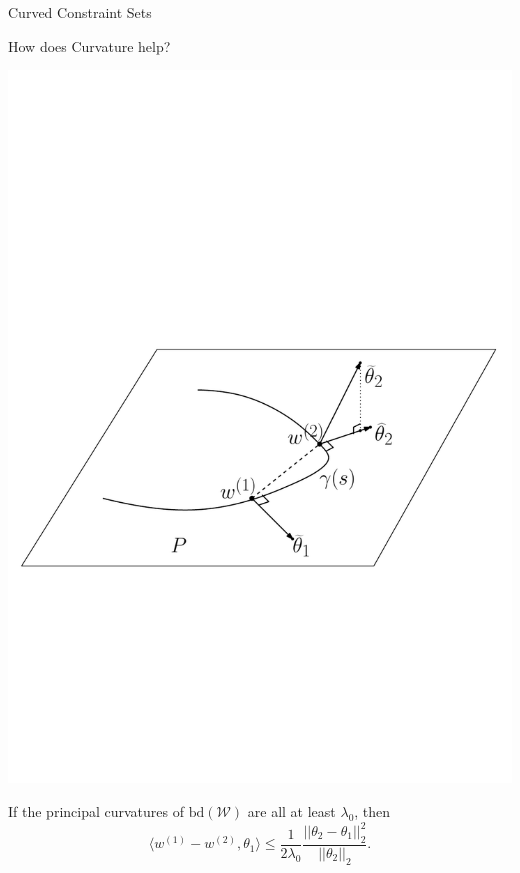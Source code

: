 \documentclass[final]{beamer} %
\newcommand{\cW}{\mathcal{W}}
\newcommand{\bd}{\mathrm{bd}}
\begin{document}
\begin{frame}[c]
\begin{columns}[t,totalwidth=\textwidth]
\begin{column}{.24\textwidth}
\begin{block}{Curved Constraint Sets}
\begin{minipage}{0.95\textwidth}
\begin{block}{How does Curvature help?}
\begin{minipage}[b]{0.4\textwidth}
					{\includegraphics[width=\textwidth, trim={4.8cm 1cm 3cm 0},clip]{figures/GaussmapPro}}
					\end{minipage}
				\end{block}
			\end{minipage}
			\begin{tcolorbox}[title = \vspace{0.4cm}{Curvature and Stability} \vspace{0.4cm}, title filled, colbacktitle = uofagreen!10, width = 0.9\textwidth, colback = uofagreen!10, colframe = red, coltitle = black, arc = 16pt]
				If the principal curvatures of $\bd(\cW)$ are all at least $\lambda_0$, then 
				\[
				\langle w^{(1)} - w^{(2)} , \theta_1 \rangle \le \frac{1}{2\lambda_0} \frac{||\theta_2 - \theta_1||_2^2}{||\theta_2||_2}.
				\]
			\end{tcolorbox}
			

\end{block}
\end{column}
\end{columns}
\end{frame}
\end{document}
